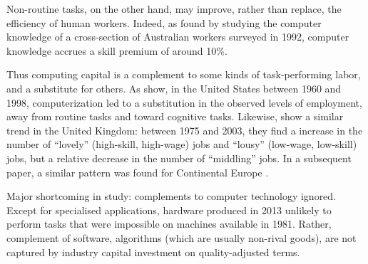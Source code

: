 \documentclass[a4paper,11pt]{article}
\begin{document}
Non-routine tasks, on the other hand, may improve, rather than replace, the efficiency of human workers. Indeed, as \citet{Borland2004} found by studying the computer knowledge of a cross-section of Australian workers surveyed in 1992, computer knowledge accrues a skill premium of around 10\%.

Thus computing capital is a complement to some kinds of task-performing labor, and a substitute for others. As \citet{Levy2003} show, in the United States between 1960 and 1998, computerization led to a substitution in the observed levels of employment, away from routine tasks and toward cognitive tasks. Likewise, \citet{Goos2007} show a similar trend in the United Kingdom: between 1975 and 2003, they find a increase in the number of ``lovely'' (high-skill, high-wage) jobs and ``lousy'' (low-wage, low-skill) jobs, but a relative decrease in the number of ``middling'' jobs. In a subsequent paper, a similar pattern was found for Continental Europe \citep{Goos2009}.




Major shortcoming in study: complements to computer technology ignored. Except for specialised applications, hardware produced in 2013 unlikely to perform tasks that were impossible on machines available in 1981. Rather, complement of software, algorithms (which are usually non-rival goods), are not captured by industry capital investment on quality-adjusted terms.



\printbibliography
\end{document}
